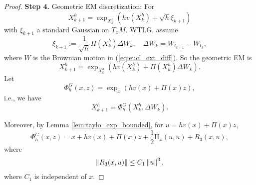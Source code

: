 \begin{proof}
     \vspace{0.5em}
    \textbf{Step 4.} Geometric EM discretization: For
    \begin{equation*}
        X_{k+1}^h=\exp _{X_k^h}\left(h v\left(X_k^h\right)+\sqrt{h} \xi_{k+1}\right)
    \end{equation*}
    with $\xi_{k+1}$ a standard Gaussian on $T_xM$. WTLG, assume
    \begin{equation*}
        \xi_{k+1}:=\frac{1}{\sqrt{h}} \Pi\left(X_k^h\right) \Delta W_k,\quad \Delta W_k = W_{t_{k+1}} - W_{t_k},
    \end{equation*}
    where $W$ is the Brownian motion in (\ref{eq:eucl_ext_diff}). So the geometric EM is
    \begin{equation*}
        X_{k+1}^h=\exp _{X_k^h}\left(h v\left(X_k^h\right)+\Pi\left(X_k^h\right) \Delta W_k\right).
    \end{equation*}
    Let
    \begin{equation*}
        \Phi^G_h(x,z) = \exp_x(hv(x) + \Pi(x)z),
    \end{equation*}
    i.e., we have
    \begin{equation*}
        X_{k+1}^h= \Phi^G_h(X_k^h,\Delta W_k).
    \end{equation*}

    Moreover, by Lemma \ref{lem:taylo_exp_bounded}, for $u = hv(x) + \Pi(x)z$,
    \begin{equation*}
        \Phi^G_h(x,z) = x + hv(x) + \Pi(x)z + \frac{1}{2}\mathrm{II}_x(u,u) + R_3(x,u),
    \end{equation*}
    where
    \begin{align*}
        \left\lVert R_3(x,u)\right\lVert \leq C_1\left\lVert u\right\lVert^3,
    \end{align*}
    where $C_1$ is independent of $x$.


\end{proof}
